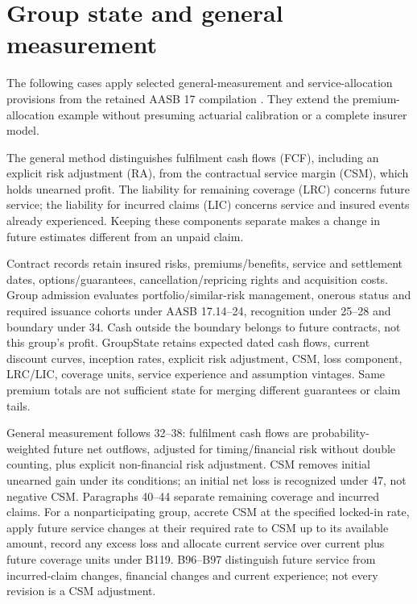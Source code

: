 \hypertarget{group-state-and-general-measurement}{%
\section{Group state and general measurement}\label{method-insurance-methods-group-state-and-general-measurement}}

The following cases apply selected general-measurement and service-allocation provisions from the retained AASB 17 compilation \citep{aasb17}. They extend the premium-allocation example without presuming actuarial calibration or a complete insurer model.

The general method distinguishes fulfilment cash flows (FCF), including an
explicit risk adjustment (RA), from the contractual service margin (CSM),
which holds unearned profit. The liability for remaining coverage (LRC)
concerns future service; the liability for incurred claims (LIC) concerns
service and insured events already experienced. Keeping these components
separate makes a change in future estimates different from an unpaid claim.

Contract records retain insured risks, premiums/benefits, service and settlement dates, options/guarantees, cancellation/repricing rights and acquisition costs. Group admission evaluates portfolio/similar-risk management, onerous status and required issuance cohorts under AASB 17.14--24, recognition under 25--28 and boundary under 34. Cash outside the boundary belongs to future contracts, not this group's profit. GroupState retains expected dated cash flows, current discount curves, inception rates, explicit risk adjustment, CSM, loss component, LRC/LIC, coverage units, service experience and assumption vintages. Same premium totals are not sufficient state for merging different guarantees or claim tails.

General measurement follows 32--38: fulfilment cash flows are probability-weighted future net outflows, adjusted for timing/financial risk without double counting, plus explicit non-financial risk adjustment. CSM removes initial unearned gain under its conditions; an initial net loss is recognized under 47, not negative CSM. Paragraphs 40--44 separate remaining coverage and incurred claims. For a nonparticipating group, accrete CSM at the specified locked-in rate, apply future service changes at their required rate to CSM up to its available amount, record any excess loss and allocate current service over current plus future coverage units under B119. B96--B97 distinguish future service from incurred-claim changes, financial changes and current experience; not every revision is a CSM adjustment.

